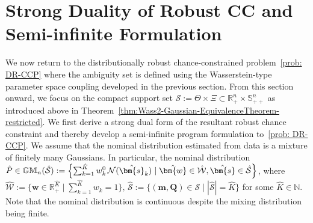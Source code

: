 \documentclass[opre,sglanonrev]{informs4}
\newcommand{\mS}{\mathcal{S}}
\newcommand{\mN}{\mathcal{N}}
\newcommand{\mW}{\mathcal{W}}
\newcommand{\mbR}{\mathbb R}
\newcommand{\mbS}{\mathbb S}
\newcommand{\mbGM}{\mathbb{GM}}
\newcommand{\bmean}{\bm{m}}
\newcommand{\bs}{\bm{s}}
\newcommand{\bw}{\bm{w}}
\newcommand{\bQ}{\bm Q}
\begin{document}
\section{Strong Duality of Robust CC and Semi-infinite Formulation}{\label{sec: formulation&Duality}

We now return to the distributionally robust chance-constrained problem~\eqref{prob: DR-CCP} where the ambiguity set is defined using the Wasserstein-type parameter space coupling developed in the previous section. From this section onward, we focus on the compact support set $\mS:=\Theta\times\Xi\subset\mbR^n_+\times\mbS^n_{++}$ as introduced above in Theorem~\ref{thm:Wass2-Gaussian-EquivalenceTheorem-restricted}. We first derive a strong dual form of the resultant robust chance constraint and thereby develop a semi-infinite program formulation to~\eqref{prob: DR-CCP}. We assume that the nominal distribution estimated from data is a mixture of finitely many Gaussians. In particular, the nominal distribution $\hat{P} \in 
\mbGM_n(\hat{\mS}):=\Bigl\{\sum_{k=1}^{\hat{K}} w^0_k\,\mN(\hat{\bs}_k) \mid
\hat{\bw}\in\hat{\mW}, \hat{\bs} \in \hat{\mS} \Bigr\}
$, where $\hat{\mW}:=\{\bw\in\mbR^{\hat{K}}_+ \mid \sum_{k=1}^{\hat{K}} w_k=1\}, \, \hat{\mS} := \bigl\{(\bmean, \bQ) \in \mS \mid |\hat{\mS} | = \hat{K} \bigr\}$ 
for some $\hat{K}\in\mathbb N$.  Note that the nominal distribution is continuous despite the mixing distribution being finite. 

}
\end{document}
